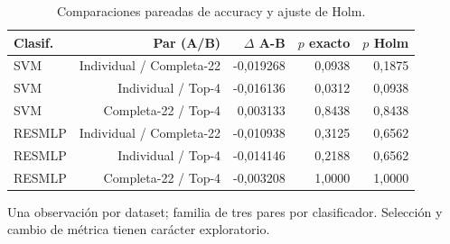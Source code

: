 \begin{table}[!htbp]\centering
\fontsize{8}{10}\selectfont\setlength{\tabcolsep}{4pt}
\caption{Comparaciones pareadas de accuracy y ajuste de Holm.}\label{tab:accuracy-pairs}
\begin{tabular}{@{}lrrrr@{}}\toprule
Clasif. & Par (A/B) & $\Delta$ A-B & $p$ exacto & $p$ Holm\\\midrule
SVM & Individual / Completa-22 & -0,019268 & 0,0938 & 0,1875\\
SVM & Individual / Top-4 & -0,016136 & 0,0312 & 0,0938\\
SVM & Completa-22 / Top-4 & 0,003133 & 0,8438 & 0,8438\\
RESMLP & Individual / Completa-22 & -0,010938 & 0,3125 & 0,6562\\
RESMLP & Individual / Top-4 & -0,014146 & 0,2188 & 0,6562\\
RESMLP & Completa-22 / Top-4 & -0,003208 & 1,0000 & 1,0000\\
\bottomrule\end{tabular}
\par\smallskip\begin{minipage}{0.98\textwidth}\footnotesize Una observación por dataset; familia de tres pares por clasificador. Selección y cambio de métrica tienen carácter exploratorio.\end{minipage}
\end{table}
